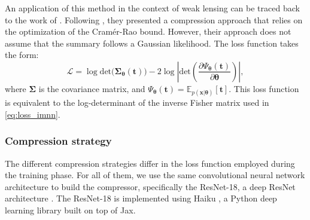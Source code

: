 \documentclass{aa}
\begin{document}
An application of this method in the context of weak lensing can be traced back to the work of \citet{fluri2021cosmological, fluri2022full}. Following \citet{charnock2018automatic}, they presented a compression approach that relies on the optimization of the Cramér-Rao bound. However, their approach does not assume that the summary follows a Gaussian likelihood. The loss function takes the form:
\begin{equation}\label{eq:loss_gfim}
\mathcal{L}=\log{\text{det}(\bm{\Sigma}_{\bm{\theta}}(\bm{t})})-2\log{\left|\text{det}\left(\frac{\partial \Psi_{\bm{\theta}}(\bm{t})}{\partial \bm{\theta}}\right)\right|},
\end{equation}
where $\bm{\Sigma}$ is the covariance matrix, and $\Psi_{\bm{\theta}}(\bm{t})=\mathbb{E}_{p(\bm {x}|\bm {\theta})}[\bm{t}]$.
This loss function is equivalent to the log-determinant of the inverse Fisher matrix used in \autoref{eq:loss_imnn}. \\
\subsubsection{Compression strategy}
The different compression strategies differ in the loss function employed during the training phase. For all of them, we use the same convolutional neural network architecture to build the compressor, specifically the ResNet-18, a deep ResNet architecture \citep{he2016deep}. The ResNet-18 is implemented using Haiku \citep{haiku2020github}, a Python deep learning library built on top of Jax.
\end{document}
